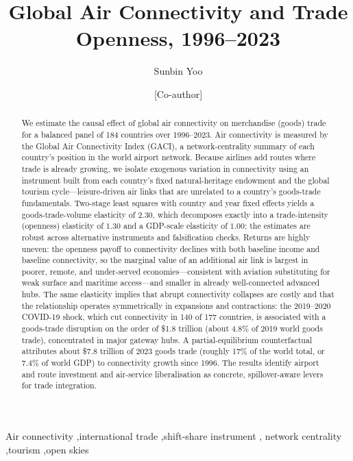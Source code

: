 \documentclass[review,3p,times]{elsarticle}
\begin{document}
\begin{frontmatter}

\title{Global Air Connectivity and Trade Openness, 1996--2023}

\author[a]{Sunbin Yoo}
\author[a]{[Co-author]}
\address[a]{[Affiliation], Kyushu University, Fukuoka, Japan}

\begin{abstract}
We estimate the causal effect of global air connectivity on merchandise
(goods) trade for a balanced panel of 184 countries over 1996--2023. Air
connectivity is measured by the Global Air Connectivity Index (GACI), a
network-centrality summary of each country's position in the world airport
network. Because airlines add routes where trade is already growing, we
isolate exogenous variation in connectivity using an instrument built from
each country's fixed natural-heritage endowment and the global tourism
cycle---leisure-driven air links that are unrelated to a country's
goods-trade fundamentals. Two-stage least squares with country and year fixed
effects yields a goods-trade-volume elasticity of $2.30$, which decomposes
exactly into a trade-intensity (openness) elasticity of $1.30$ and a GDP-scale
elasticity of $1.00$; the estimates are robust across alternative instruments
and falsification checks. Returns are highly uneven: the openness payoff to
connectivity declines with both baseline income and baseline connectivity, so
the marginal value of an additional air link is largest in poorer, remote, and
under-served economies---consistent with aviation substituting for weak
surface and maritime access---and smaller in already well-connected advanced
hubs. The same elasticity implies that abrupt connectivity collapses are
costly and that the relationship operates symmetrically in expansions and
contractions: the 2019--2020 COVID-19 shock, which cut connectivity in 140 of
177 countries, is associated with a goods-trade disruption on the order of
\$1.8 trillion (about 4.8\% of 2019 world goods trade), concentrated in major
gateway hubs. A partial-equilibrium counterfactual attributes about \$7.8
trillion of 2023 goods trade (roughly 17\% of the world total, or 7.4\% of
world GDP) to connectivity growth since 1996. The results identify airport and
route investment and air-service liberalisation as concrete, spillover-aware
levers for trade integration.
\end{abstract}

\begin{keyword}
Air connectivity \sep international trade \sep shift-share instrument \sep
network centrality \sep tourism \sep open skies
\end{keyword}

\end{frontmatter}
\end{document}

